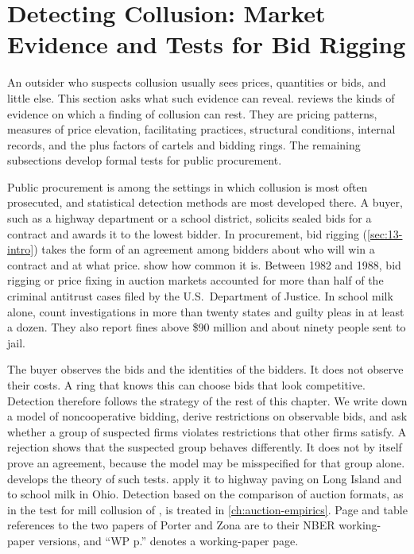 \section{Detecting Collusion: Market Evidence and Tests for Bid Rigging}\label{sec:13-detection}

An outsider who suspects collusion usually sees prices, quantities or bids, and little else. This section asks
what such evidence can reveal.  reviews the kinds of evidence on which a finding of
collusion can rest. They are pricing patterns, measures of price elevation, facilitating practices, structural
conditions, internal records, and the plus factors of cartels and bidding rings. The remaining subsections develop
formal tests for public procurement.

Public procurement is among the settings in which collusion is most often prosecuted, and statistical detection
methods are most developed there. A buyer, such as a highway department or a school district, solicits sealed bids for a
contract and awards it to the lowest bidder. In procurement, bid rigging (\cref{sec:13-intro}) takes the form of an
agreement among bidders about who will win a contract and at what price. \citet[p.~1]{PorterZona1993} show how common it is. Between 1982 and 1988,
bid rigging or price fixing in auction markets accounted for more than half of the criminal antitrust cases filed
by the U.S.\ Department of Justice. In school milk alone, \citet[p.~1]{PorterZona1999} count investigations in more than twenty
states and guilty pleas in at least a dozen. They also report fines above \$90 million and about ninety people sent
to jail.

The buyer observes the bids and the identities of the bidders. It does not observe their costs. A ring that knows
this can choose bids that look competitive. Detection therefore follows the strategy of the rest of this chapter.
We write down a model of noncooperative bidding, derive restrictions on observable bids, and ask whether a group
of suspected firms violates restrictions that other firms satisfy. A rejection shows that the suspected group
behaves differently. It does not by itself prove an agreement, because the model may be misspecified for that
group alone.  develops the theory of such tests. 
apply it to highway paving on Long Island and to school milk in Ohio. Detection based on the comparison of auction
formats, as in the test for mill collusion of \citet{AtheyLevinSeira2011}, is treated in \cref{ch:auction-empirics}.
Page and table references to the two papers of Porter and Zona are to their NBER working-paper versions, and ``WP
p.'' denotes a working-paper page.

